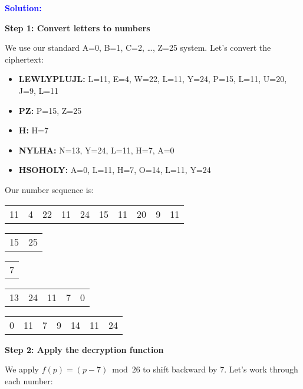 \documentclass[12pt]{article}
\begin{document}
\noindent\textbf{\textcolor{blue}{Solution:}}

\textbf{Step 1: Convert letters to numbers}

We use our standard A=0, B=1, C=2, \ldots, Z=25 system. Let's convert the ciphertext:

\begin{itemize}[leftmargin=*]
\item \textbf{LEWLYPLUJL:} L=11, E=4, W=22, L=11, Y=24, P=15, L=11, U=20, J=9, L=11
\item \textbf{PZ:} P=15, Z=25
\item \textbf{H:} H=7
\item \textbf{NYLHA:} N=13, Y=24, L=11, H=7, A=0
\item \textbf{HSOHOLY:} A=0, L=11, H=7, O=14, L=11, Y=24
\end{itemize}

\vspace{0.2cm}
\noindent Our number sequence is:
\begin{center}
\begin{tabular}{cccccccccc}
11 & 4 & 22 & 11 & 24 & 15 & 11 & 20 & 9 & 11 \\
\end{tabular}
\end{center}
\begin{center}
\begin{tabular}{cc}
15 & 25 \\
\end{tabular}
\qquad
\begin{tabular}{c}
7 \\
\end{tabular}
\qquad
\begin{tabular}{ccccc}
13 & 24 & 11 & 7 & 0 \\
\end{tabular}
\qquad
\begin{tabular}{cccccc}
0 & 11 & 7 & 9 & 14 & 11 & 24
\end{tabular}
\end{center}

\vspace{0.3cm}

\textbf{Step 2: Apply the decryption function}

We apply $f(p) = (p - 7) \bmod 26$ to shift backward by 7. Let's work through each number:
\end{document}
